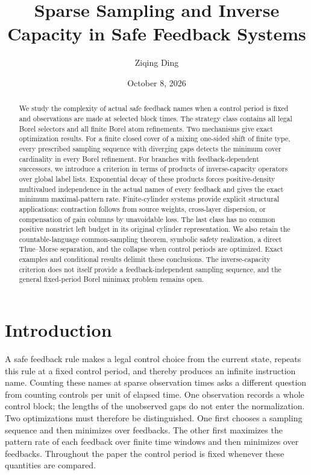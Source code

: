 \documentclass[11pt,reqno]{amsart}
\title[Sparse sampling and inverse capacity]{Sparse Sampling and Inverse Capacity in Safe Feedback Systems}
\author{Ziqing Ding}
\date{October 8, 2026}
\numberwithin{equation}{section}
\theoremstyle{definition}
\begin{document}
\begin{abstract}
We study the complexity of actual safe feedback names when a control
period is fixed and observations are made at selected block times.
The strategy class contains all legal Borel selectors and all finite
Borel atom refinements. Two mechanisms give exact optimization results.
For a finite closed cover of a mixing one-sided shift of finite type,
every prescribed sampling sequence with diverging gaps detects the
minimum cover cardinality in every Borel refinement. For branches with
feedback-dependent successors, we introduce a criterion in terms of
products of inverse-capacity operators over global label lists.
Exponential decay of these products forces positive-density multivalued
independence in the actual names of every feedback and gives the exact
minimum maximal-pattern rate. Finite-cylinder systems provide explicit
structural applications: contraction follows from source weights,
cross-layer dispersion, or compensation of gain columns by unavoidable
loss. The last class has no common positive nonstrict left budget in its
original cylinder representation. We also retain the countable-language
common-sampling theorem, symbolic safety realization, a direct
Thue--Morse separation, and the collapse when control periods are
optimized. Exact examples and conditional results delimit these
conclusions. The inverse-capacity criterion does not itself provide a
feedback-independent sampling sequence, and the general fixed-period
Borel minimax problem remains open.
\end{abstract}
\maketitle
\tableofcontents

\section{Introduction}\label{sec:intro}

A safe feedback rule makes a legal control choice from the current
state, repeats this rule at a fixed control period, and thereby produces
an infinite instruction name. Counting these names at sparse observation
times asks a different question from counting controls per unit of
elapsed time. One observation records a whole control block; the lengths
of the unobserved gaps do not enter the normalization. Two optimizations
must therefore be distinguished. One first chooses a sampling sequence
and then minimizes over feedbacks. The other first maximizes the pattern
rate of each feedback over finite time windows and then minimizes over
feedbacks. Throughout the paper the control period is fixed whenever
these quantities are compared.
\end{document}
